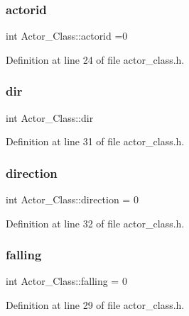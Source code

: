 \subsubsection{\texorpdfstring{actorid}{actorid}}
{\footnotesize\ttfamily int Actor\+\_\+\+Class\+::actorid =0}



Definition at line 24 of file actor\+\_\+class.\+h.

\hypertarget{class_actor___class_a19615eb6b350b927e943c203f6d6ba6b}{}\label{class_actor___class_a19615eb6b350b927e943c203f6d6ba6b} 
\subsubsection{\texorpdfstring{dir}{dir}}
{\footnotesize\ttfamily int Actor\+\_\+\+Class\+::dir}



Definition at line 31 of file actor\+\_\+class.\+h.

\hypertarget{class_actor___class_a843a4b6d14c54fff28e5956842d4988c}{}\label{class_actor___class_a843a4b6d14c54fff28e5956842d4988c} 
\subsubsection{\texorpdfstring{direction}{direction}}
{\footnotesize\ttfamily int Actor\+\_\+\+Class\+::direction = 0}



Definition at line 32 of file actor\+\_\+class.\+h.

\hypertarget{class_actor___class_a6230b3e81995e83745eb532f883cf7d2}{}\label{class_actor___class_a6230b3e81995e83745eb532f883cf7d2} 
\subsubsection{\texorpdfstring{falling}{falling}}
{\footnotesize\ttfamily int Actor\+\_\+\+Class\+::falling = 0}



Definition at line 29 of file actor\+\_\+class.\+h.

\hypertarget{class_actor___class_a4c38df985dea8585c3de3eea8eab6514}{}\label{class_actor___class_a4c38df985dea8585c3de3eea8eab6514} 
